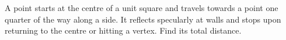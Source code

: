A point starts at the centre of a unit square and travels towards a point one quarter of the way along a side. It reflects specularly at walls and stops upon returning to the centre or hitting a vertex. Find its total distance.
